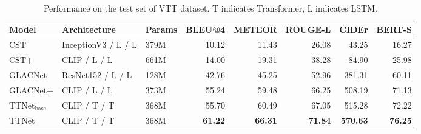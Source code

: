 \begin{table}[ht]
\centering
\small
\caption{Performance on the test set of VTT dataset. T indicates Transformer, L indicates LSTM.}
\label{tab:baseline}
\begin{tabular}{lllrrrrr}
\toprule
Model & Architecture & Params & BLEU@4 & METEOR & ROUGE-L & CIDEr & BERT-S \\
\midrule
CST & InceptionV3 / L / L & 379M & 10.12 & 11.43 & 26.08 & 43.25 & 16.27 \\
CST+ & CLIP / L / L & 661M & 14.00 & 19.31 & 38.28 & 84.90 & 25.98 \\
GLACNet & ResNet152 / L / L & 128M & 42.76 & 45.25 & 52.96 & 381.31 & 60.11 \\
GLACNet+ & CLIP / L / L & 373M & 55.24 & 59.48 & 66.25 & 508.19 & 71.13 \\
TTNet$_\text{base}$ & CLIP / T / T & 368M & 55.70 & 60.49 & 67.05 & 515.28 & 72.22 \\
TTNet & CLIP / T / T & 368M & \textbf{61.22} & \textbf{66.31} & \textbf{71.84} & \textbf{570.63} & \textbf{76.25} \\
\bottomrule
\end{tabular}
\end{table}
